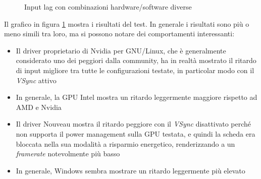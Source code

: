 \begin{figure}[h!]
	\centering
	\dataset
	\caption{Input lag con combinazioni hardware/software diverse}
	\label{fig:inputlag_os}
\end{figure}

Il grafico in figura \ref{fig:inputlag_os} mostra i risultati del test. In generale i risultati sono più o meno simili tra loro, ma si possono notare dei comportamenti interessanti:\begin{itemize}
	\item Il driver proprietario di Nvidia per GNU/Linux, che è generalmente considerato uno dei peggiori dalla community, ha in realtà mostrato il ritardo di input migliore tra tutte le configurazioni testate, in particolar modo con il \textit{VSync} attivo
	\item In generale, la GPU Intel mostra un ritardo leggermente maggiore rispetto ad AMD e Nvidia
	\item Il driver Nouveau mostra il ritardo peggiore con il \textit{VSync} disattivato perché non supporta il power management sulla GPU testata, e quindi la scheda era bloccata nella sua modalità a risparmio energetico, renderizzando a un \textit{framerate} notevolmente più basso
	\item In generale, Windows sembra mostrare un ritardo leggermente più elevato
\end{itemize}

